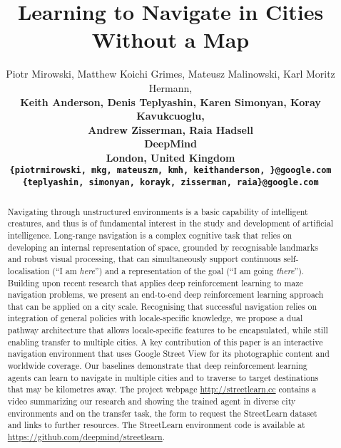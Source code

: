 \documentclass{article}
\title{Learning to Navigate in Cities Without a Map}
\author{
  Piotr Mirowski, Matthew Koichi Grimes, Mateusz Malinowski, Karl Moritz Hermann, \\
  \bf{Keith Anderson, Denis Teplyashin, Karen Simonyan, Koray Kavukcuoglu,} \\
  \bf{Andrew Zisserman, Raia Hadsell}\\
  DeepMind\\
  London, United Kingdom\\
  \texttt{\{piotrmirowski, mkg, mateuszm, kmh, keithanderson, \}@google.com} \\
  \texttt{\{teplyashin, simonyan, korayk, zisserman, raia\}@google.com} \\
}
\begin{document}
\maketitle

\newcommand{\ed}[1]{\textcolor{cyan}{\bf \small #1}}
\newcommand{\piotr}[1]{\textcolor{cyan}{\bf \small [#1 --PM]}}
\newcommand{\rh}[1]{\textcolor{blue}{\bf \small [#1 --RH]}}
\newcommand{\mati}[1]{\textcolor{green}{\bf \small [#1 --MM]}}
\newcommand{\karen}[1]{\textcolor{black}{\bf \small [#1 --Karen]}}
\newcommand{\az}[1]{\textcolor{red}{\bf \small [#1 --AZ]}}
\newcommand{\kmh}[1]{\textcolor{darkblue}{\bf\small [#1 --KMH]}}


\begin{abstract}
Navigating through unstructured environments is a basic capability of intelligent creatures, and thus is of fundamental interest in the study and development of artificial intelligence. Long-range navigation is a complex cognitive task that relies on developing an internal representation of space, grounded by recognisable landmarks and robust visual processing, that can simultaneously support continuous self-localisation (``I am \emph{here}'') and a representation of the goal (``I am going \emph{there}''). Building upon recent research that applies deep reinforcement learning to maze navigation problems, we present an end-to-end deep reinforcement learning approach that can be applied on a city scale. Recognising that successful navigation relies on integration of general policies with locale-specific knowledge, we propose a dual pathway architecture that allows locale-specific features to be encapsulated, while still enabling transfer to multiple cities. A key contribution of this paper is an interactive navigation environment that uses Google Street View for its photographic content and worldwide coverage. Our baselines demonstrate that deep reinforcement learning agents can learn to navigate in multiple cities and to traverse to target destinations that may be kilometres away. The project webpage \url{http://streetlearn.cc} contains a video summarizing our research and showing the trained agent in diverse city environments and on the transfer task, the form to request the StreetLearn dataset and links to further resources. The StreetLearn environment code is available at \url{https://github.com/deepmind/streetlearn}.

\end{abstract}
\end{document}
